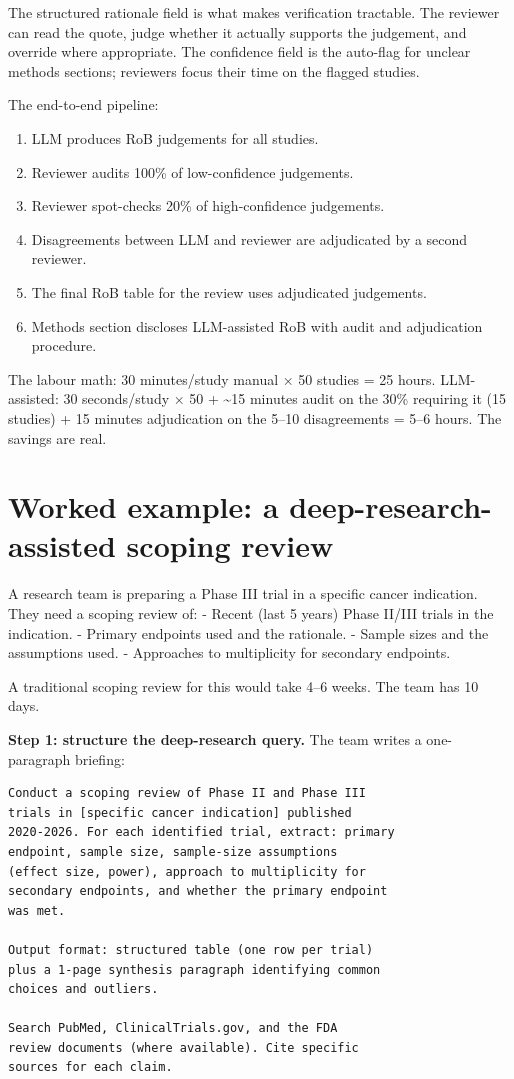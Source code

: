 \documentclass[
  letterpaper,
  11pt]{scrbook}
\providecommand{\tightlist}{%
  \setlength{\itemsep}{0pt}\setlength{\parskip}{0pt}}
\begin{document}
The structured rationale field is what makes verification tractable. The
reviewer can read the quote, judge whether it actually supports the
judgement, and override where appropriate. The confidence field is the
auto-flag for unclear methods sections; reviewers focus their time on
the flagged studies.

The end-to-end pipeline:

\begin{enumerate}
\def\labelenumi{\arabic{enumi}.}
\tightlist
\item
  LLM produces RoB judgements for all studies.
\item
  Reviewer audits 100\% of low-confidence judgements.
\item
  Reviewer spot-checks 20\% of high-confidence judgements.
\item
  Disagreements between LLM and reviewer are adjudicated by a second
  reviewer.
\item
  The final RoB table for the review uses adjudicated judgements.
\item
  Methods section discloses LLM-assisted RoB with audit and adjudication
  procedure.
\end{enumerate}

The labour math: 30 minutes/study manual × 50 studies = 25 hours.
LLM-assisted: 30 seconds/study × 50 + \textasciitilde15 minutes audit on
the 30\% requiring it (15 studies) + 15 minutes adjudication on the
5--10 disagreements = 5--6 hours. The savings are real.

\section{Worked example: a deep-research-assisted scoping
review}\label{worked-example-a-deep-research-assisted-scoping-review}

A research team is preparing a Phase III trial in a specific cancer
indication. They need a scoping review of: - Recent (last 5 years) Phase
II/III trials in the indication. - Primary endpoints used and the
rationale. - Sample sizes and the assumptions used. - Approaches to
multiplicity for secondary endpoints.

A traditional scoping review for this would take 4--6 weeks. The team
has 10 days.

\textbf{Step 1: structure the deep-research query.} The team writes a
one-paragraph briefing:

\begin{verbatim}
Conduct a scoping review of Phase II and Phase III
trials in [specific cancer indication] published
2020-2026. For each identified trial, extract: primary
endpoint, sample size, sample-size assumptions
(effect size, power), approach to multiplicity for
secondary endpoints, and whether the primary endpoint
was met.

Output format: structured table (one row per trial)
plus a 1-page synthesis paragraph identifying common
choices and outliers.

Search PubMed, ClinicalTrials.gov, and the FDA
review documents (where available). Cite specific
sources for each claim.
\end{verbatim}
\end{document}
